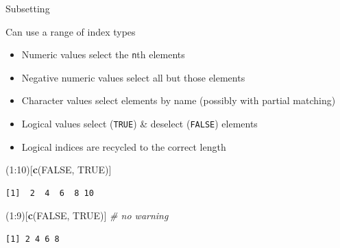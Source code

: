 \documentclass[10pt,ignorenonframetext,compress, aspectratio=169]{beamer}
\newenvironment{Shaded}{\begin{snugshade}}{\end{snugshade}}
\newcommand{\KeywordTok}[1]{\textcolor[rgb]{0.13,0.29,0.53}{\textbf{{#1}}}}
\newcommand{\DecValTok}[1]{\textcolor[rgb]{0.00,0.00,0.81}{{#1}}}
\newcommand{\CommentTok}[1]{\textcolor[rgb]{0.56,0.35,0.01}{\textit{{#1}}}}
\newcommand{\OtherTok}[1]{\textcolor[rgb]{0.56,0.35,0.01}{{#1}}}
\newcommand{\NormalTok}[1]{{#1}}
\begin{document}
\begin{frame}[fragile]{Subsetting}

Can use a range of \alert{index} types

\begin{itemize}
\itemsep1pt\parskip0pt
\item
  Numeric values select the \texttt{n}th elements
\item
  Negative numeric values select all but those elements
\item
  Character values select elements by name (possibly with partial
  matching)
\item
  Logical values select (\texttt{TRUE}) \& deselect (\texttt{FALSE})
  elements
\item
  Logical indices are \alert{recycled} to the correct length
\end{itemize}

\scriptsize

\begin{Shaded}
\begin{Highlighting}[]
\NormalTok{(}\DecValTok{1}\NormalTok{:}\DecValTok{10}\NormalTok{)[}\KeywordTok{c}\NormalTok{(}\OtherTok{FALSE}\NormalTok{, }\OtherTok{TRUE}\NormalTok{)]}
\end{Highlighting}
\end{Shaded}

\begin{verbatim}
[1]  2  4  6  8 10
\end{verbatim}

\begin{Shaded}
\begin{Highlighting}[]
\NormalTok{(}\DecValTok{1}\NormalTok{:}\DecValTok{9}\NormalTok{)[}\KeywordTok{c}\NormalTok{(}\OtherTok{FALSE}\NormalTok{, }\OtherTok{TRUE}\NormalTok{)]                   }\CommentTok{# no warning}
\end{Highlighting}
\end{Shaded}

\begin{verbatim}
[1] 2 4 6 8
\end{verbatim}

\normalsize

\end{frame}
\end{document}
